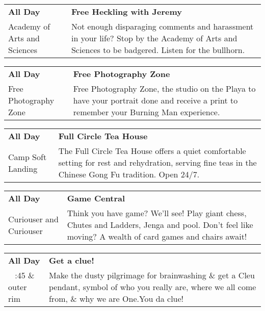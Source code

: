 \begin{tabular}{ p{1in} p{2.2in} }
    \textbf{All Day} & \textbf{Free Heckling with Jeremy} \\
    Academy of Arts and Sciences \newline  & Not enough disparaging comments and harassment in your life?  Stop by the Academy of Arts and Sciences to be badgered.  Listen for the bullhorn. \\
    \hline 
\end{tabular}
    
\begin{tabular}{ p{1in} p{2.2in} }
    \textbf{All Day} & \textbf{Free Photography Zone} \\
    Free Photography Zone \newline  & Free Photography Zone, the studio on the Playa to have your portrait done and receive a print to remember your Burning Man experience. \\
    \hline 
\end{tabular}
    
\begin{tabular}{ p{1in} p{2.2in} }
    \textbf{All Day} & \textbf{Full Circle Tea House} \\
    Camp Soft Landing \newline  & The Full Circle Tea House offers a quiet comfortable setting for rest and rehydration, serving fine teas in the Chinese Gong Fu tradition. Open 24/7. \\
    \hline 
\end{tabular}
    
\begin{tabular}{ p{1in} p{2.2in} }
    \textbf{All Day} & \textbf{Game Central} \\
    Curiouser and Curiouser \newline  & Think you have game? We'll see! Play giant chess, Chutes and Ladders, Jenga and pool. Don't feel like moving? A wealth of card games and chairs await! \\
    \hline 
\end{tabular}
    
\begin{tabular}{ p{1in} p{2.2in} }
    \textbf{All Day} & \textbf{Get a clue!} \\
    ~ \newline 3:45 \& outer rim & Make the dusty pilgrimage for brainwashing \& get a Cleu pendant, symbol of who you really are, where we all come from, \& why we are One.You da clue! \\
    \hline 
\end{tabular}
    
